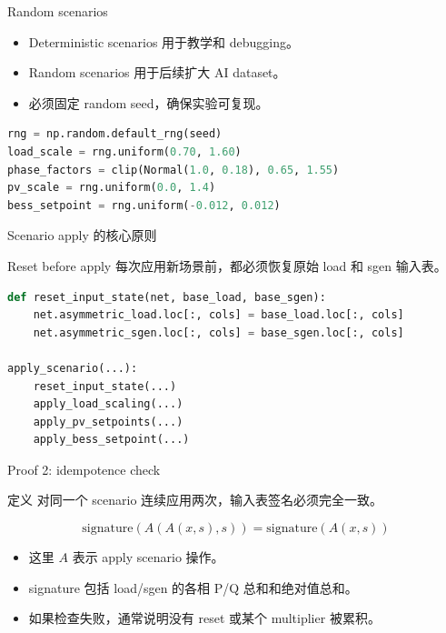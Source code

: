 \documentclass[aspectratio=169,11pt]{beamer}
\begin{document}
\begin{frame}[fragile]{Random scenarios}
\begin{itemize}
  \item Deterministic scenarios 用于教学和 debugging。
  \item Random scenarios 用于后续扩大 AI dataset。
  \item 必须固定 random seed，确保实验可复现。
\end{itemize}
\begin{lstlisting}[language=Python]
rng = np.random.default_rng(seed)
load_scale = rng.uniform(0.70, 1.60)
phase_factors = clip(Normal(1.0, 0.18), 0.65, 1.55)
pv_scale = rng.uniform(0.0, 1.4)
bess_setpoint = rng.uniform(-0.012, 0.012)
\end{lstlisting}
\end{frame}

\begin{frame}[fragile]{Scenario apply 的核心原则}
\begin{block}{Reset before apply}
每次应用新场景前，都必须恢复原始 load 和 sgen 输入表。
\end{block}
\begin{lstlisting}[language=Python]
def reset_input_state(net, base_load, base_sgen):
    net.asymmetric_load.loc[:, cols] = base_load.loc[:, cols]
    net.asymmetric_sgen.loc[:, cols] = base_sgen.loc[:, cols]

apply_scenario(...):
    reset_input_state(...)
    apply_load_scaling(...)
    apply_pv_setpoints(...)
    apply_bess_setpoint(...)
\end{lstlisting}
\end{frame}

\begin{frame}{Proof 2: idempotence check}
\begin{block}{定义}
对同一个 scenario 连续应用两次，输入表签名必须完全一致。
\end{block}
\[
\mathrm{signature}(A(A(x,s),s)) = \mathrm{signature}(A(x,s))
\]
\begin{itemize}
  \item 这里 $A$ 表示 apply scenario 操作。
  \item signature 包括 load/sgen 的各相 P/Q 总和和绝对值总和。
  \item 如果检查失败，通常说明没有 reset 或某个 multiplier 被累积。
\end{itemize}
\end{frame}
\end{document}
